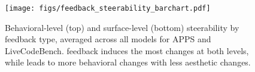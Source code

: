\begin{figure}[t]
    \centering
    \texttt{[image: figs/feedback\_steerability\_barchart.pdf]}
    \caption{
         Behavioral-level (top) and surface-level (bottom) steerability by feedback type, averaged across all models for APPS and LiveCodeBench.
         \para{} feedback induces the most changes at both levels, while \cf{} leads to more behavioral changes with less aesthetic changes.
    }
    
    \label{fig:feedback_steerability_barchart}
\end{figure}
